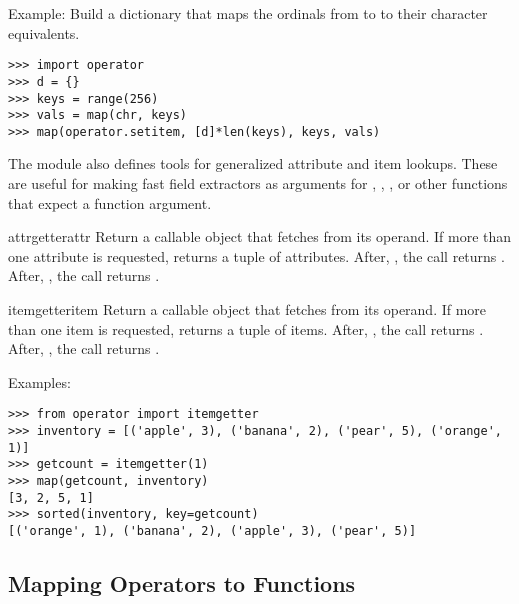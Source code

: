 Example: Build a dictionary that maps the ordinals from  to
 to their character equivalents.

\begin{verbatim}
>>> import operator
>>> d = {}
>>> keys = range(256)
>>> vals = map(chr, keys)
>>> map(operator.setitem, [d]*len(keys), keys, vals)
\end{verbatim}


The  module also defines tools for generalized attribute
and item lookups.  These are useful for making fast field extractors
as arguments for , ,
, or other functions that expect a
function argument.

\begin{funcdesc}{attrgetter}{attr}
Return a callable object that fetches  from its operand.
If more than one attribute is requested, returns a tuple of attributes.
After, , the call  returns
.  After, , the call
 returns . 
\end{funcdesc}
    
\begin{funcdesc}{itemgetter}{item}
Return a callable object that fetches  from its operand.
If more than one item is requested, returns a tuple of items.
After, , the call  returns
.
After, , the call  returns
.		
\end{funcdesc}

Examples:
                
\begin{verbatim}
>>> from operator import itemgetter
>>> inventory = [('apple', 3), ('banana', 2), ('pear', 5), ('orange', 1)]
>>> getcount = itemgetter(1)
>>> map(getcount, inventory)
[3, 2, 5, 1]
>>> sorted(inventory, key=getcount)
[('orange', 1), ('banana', 2), ('apple', 3), ('pear', 5)]
\end{verbatim}
                

\subsection{Mapping Operators to Functions \label{operator-map}}

